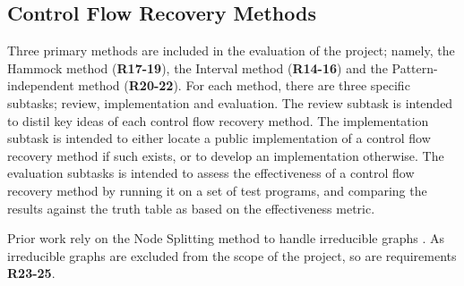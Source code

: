 
\subsection{Control Flow Recovery Methods}
\label{sec:requirements_control_flow_recovery_methods}

Three primary methods are included in the evaluation of the project; namely, the Hammock method (\textbf{R17-19}), the Interval method (\textbf{R14-16}) and the Pattern-independent method (\textbf{R20-22}). For each method, there are three specific subtasks; review, implementation and evaluation. The review subtask is intended to distil key ideas of each control flow recovery method. The implementation subtask is intended to either locate a public implementation of a control flow recovery method if such exists, or to develop an implementation otherwise. The evaluation subtasks is intended to assess the effectiveness of a control flow recovery method by running it on a set of test programs, and comparing the results against the truth table as based on the effectiveness metric.

Prior work rely on the Node Splitting method to handle irreducible graphs \cite{node_splitting}. As irreducible graphs are excluded from the scope of the project, so are requirements \textbf{R23-25}.

